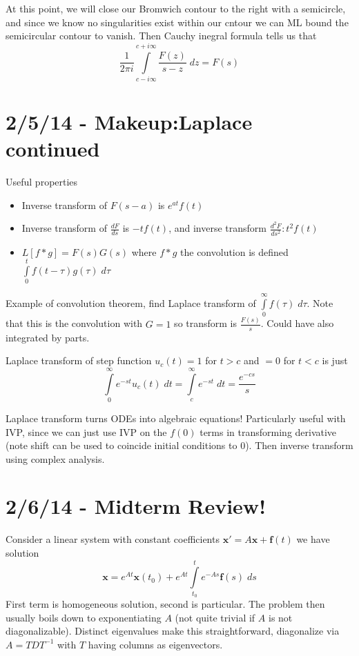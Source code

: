 \documentclass[10pt]{report}
\newcommand{\rtd}[2]{\frac{d^2#1}{d#2^2}}
\newcommand{\rd}[2]{\frac{d#1}{d#2}}
\begin{document}
At this point, we will close our Bromwich contour to the right with a semicircle, and since we know no singularities exist within our cntour we can ML bound the semicircular contour to vanish. Then Cauchy inegral formula tells us that
\begin{equation}
    \frac{1}{2\pi i}\displaystyle\int\limits_{c-i\infty}^{c+i\infty}\frac{F(z)}{s-z}\;dz = F(s)
\end{equation}

\chapter{2/5/14 - Makeup:Laplace continued}

Useful properties
\begin{itemize}
    \item Inverse transform of $F(s-a)$ is $e^{at}f(t)$
    \item Inverse transform of $\rd{F}{s}$ is $-tf(t)$, and inverse transform $\rtd{F}{s}: t^2 f(t)$ 
    \item $L[f*g] = F(s)G(s)$ where $f*g$ the convolution is defined $\displaystyle\int\limits_{0}^{t}f(t-\tau)g(\tau)\;d\tau$
\end{itemize}

Example of convolution theorem, find Laplace transform of $\displaystyle\int\limits_{0}^{\infty}f(\tau)\;d\tau$. Note that this is the convolution with $G = 1$ so transform is $\frac{F(s)}{s}$. Could have also integrated by parts.

Laplace transform of step function $u_c(t) = 1$ for $t > c$ and $=0$ for $t < c$ is just 
$$\displaystyle\int\limits_{0}^{\infty}e^{-st}u_c(t)\;dt = \displaystyle\int\limits_{c}^{\infty}e^{-st}\;dt = \frac{e^{-cs}}{s}$$

Laplace transform turns ODEs into algebraic equations! Particularly useful with IVP, since we can just use IVP on the $f(0)$ terms in transforming derivative (note shift can be used to coincide initial conditions to $0$). Then inverse transform using complex analysis.
\chapter{2/6/14 - Midterm Review!}

Consider a linear system with constant coefficients $\mathbf{x}' = A\mathbf{x} + \mathbf{f}(t)$ we have solution
\begin{equation}
    \mathbf{x} = e^{At} \mathbf{x}(t_0) + e^{At}\displaystyle\int\limits_{t_0}^{t}e^{-As}\mathbf{f}(s)\;ds
    \label{2.6.gensol}
\end{equation}
First term is homogeneous solution, second is particular. The problem then usually boils down to exponentiating $A$ (not quite trivial if $A$ is not diagonalizable). Distinct eigenvalues make this straightforward, diagonalize via $A = TDT^{-1}$ with $T$ having columns as eigenvectors. 
\end{document}
